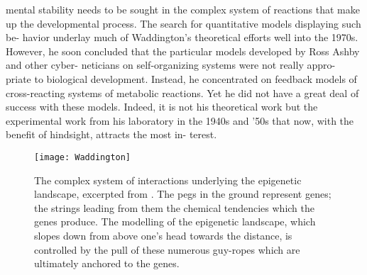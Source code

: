 \begin{longquote}
mental stability needs to be sought in the complex system
of reactions that make up the developmental process.
The search for quantitative models displaying such be-
havior underlay much of Waddington’s theoretical efforts
well into the 1970s. However, he soon concluded that the
particular models developed by Ross Ashby and other cyber-
neticians on self-organizing systems were not really appro-
priate to biological development. Instead, he concentrated
on feedback models of cross-reacting systems of metabolic
reactions. Yet he did not have a great deal of success with
these models. Indeed, it is not his theoretical work but the
experimental work from his laboratory in the 1940s and ’50s
that now, with the benefit of hindsight, attracts the most in-
terest.
\cite[p.117-119]{Keller2000}
\end{longquote}

\begin{figure}
\texttt{[image: Waddington]}
\centering
\caption{The complex system of interactions underlying the epigenetic landscape, excerpted from \cite{Waddington1957}.
The pegs in the ground represent genes; the strings leading from
them the chemical tendencies which the genes produce. The
modelling of the epigenetic landscape, which slopes down from
above one's head towards the distance, is controlled by the pull
of these numerous guy-ropes which are ultimately anchored to
the genes.}
\label{fig:Waddington}
\end{figure}